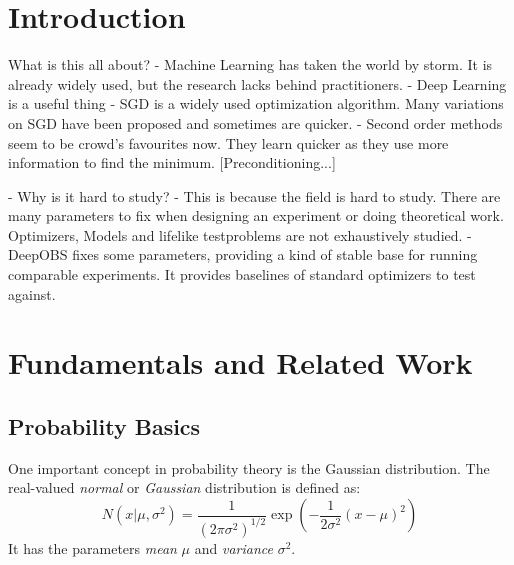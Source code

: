 \documentclass[twoside,12pt,a4paper]{report}
\begin{document}

\renewcommand{\baselinestretch}{1.3}
\small\normalsize

\tableofcontents

\renewcommand{\baselinestretch}{1}
\small\normalsize

\cleardoublepage


\setcounter{page}{1}


\chapter{Introduction}
What is this all about?
- Machine Learning has taken the world by storm. It is already widely used, but the research lacks behind practitioners.
- Deep Learning is a useful thing
- SGD is a widely used optimization algorithm. Many variations on SGD have been proposed and sometimes are quicker.
- Second order methods seem to be crowd's favourites now. They learn quicker as they use more information to find the minimum.
[Preconditioning...]


- Why is it hard to study?
- This is because the field is hard to study. There are many parameters to fix when designing an experiment or doing theoretical work. Optimizers, Models and lifelike testproblems are not exhaustively studied.
- DeepOBS fixes some parameters, providing a kind of stable base for running comparable experiments. It provides baselines of standard optimizers to test against.


\chapter{Fundamentals and Related Work}
\section{Probability Basics}
One important concept in probability theory is the Gaussian distribution.
The real-valued \textit{normal} or \textit{Gaussian} distribution is defined as:
$$N(x | \mu, \sigma^2) = \frac{1}{(2\pi \sigma^2)^{1/2}} \exp\left(- \frac{1}{2\sigma^2} (x-\mu)^2 \right)$$
It has the parameters \textit{mean} $\mu$ and \textit{variance} $\sigma ^2$.
\end{document}

